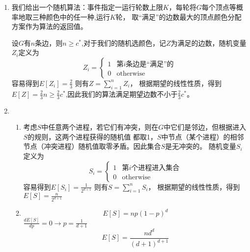 \documentclass[a4paper]{article}
\begin{document}
\begin{enumerate}[label=\arabic*.]
  \setlength{\itemsep}{3\parskip}

  \item 
    我们给出一个随机算法：事件指定一运行轮数上限$K$，每轮将$G$每个顶点等概率地取三种颜色中的任一种,运行$K$轮，
    取“满足”的边数最大的顶点颜色分配方案作为算法的返回值。
    
    设$G$有$n$条边，则$n\geq c^*$,对于我们的随机选颜色，记$Z$为满足的边数，随机变量$Z_i$定义为
    \begin{equation}
        Z_i = 
        \begin{cases}
            1 & \text{第$i$条边是“满足”的}\\
            0 & \text{otherwise}
        \end{cases}    
    \end{equation}
    容易得到$E[Z_i]=\frac{2}{3}$
    则有$Z=\sum_{i=1}^n Z_i$，
    根据期望的线性性质，得到$E[Z]=\frac{2}{3}n\geq \frac{2}{3}c^*$,因此我们的算法满足期望边数不小于$\frac{2}{3}c^*$。
    
  \setcounter{enumi}{2}    
    \item \begin{enumerate}[label=(\alph*)]
    \item 
      考虑$S$中任意两个进程，若它们有冲突，则在$G$中它们是邻边，但根据进入$S$的规则，这两个进程获得的随机值
      都取1，$S$中节点（某个进程）的相邻节点（冲突进程）随机值取零矛盾。因此集合$S$是无冲突的。
      随机变量$S_i$定义为
    \begin{equation}
        S_i = 
        \begin{cases}
            1 & \text{第$i$个进程进入集合}\\
            0 & \text{otherwise}
        \end{cases}    
    \end{equation}
    容易得到$E[S_i]=\frac{1}{2^{d+1}}$
    则有$S=\sum_{i=1}^n S_i$，
    根据期望的线性性质，得到$E[S]=\frac{n}{2^{d+1}}$
    
    \item 
    \begin{equation}
        E[S]=np(1-p)^d
    \end{equation}
    $\frac{d E[S]}{d p}=0 \rightarrow p=\frac{1}{d+1}$
    \begin{equation}
        E[S]=\frac{nd^d}{(d+1)^{d+1}}
    \end{equation}
    
    
    \end{enumerate}


\end{enumerate}
\end{document}
